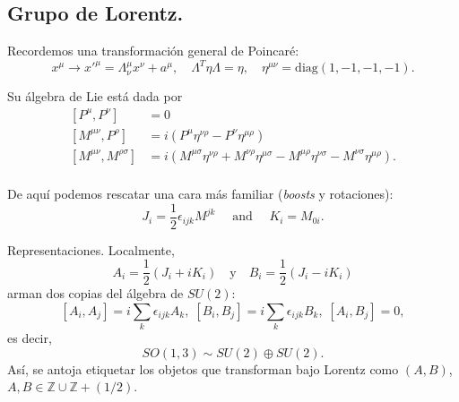 \documentclass[10pt,a4paper]{beamer}
\begin{document}
\subsection{Grupo de Lorentz.}
\begin{frame}{ \subsecname} 
  Recordemos una transformación general de Poincaré:
\[
  x^\mu \to x'^\mu = \Lambda^\mu_\nu x^\nu + a^\mu,\quad 
  \Lambda^T\eta\Lambda = \eta, \quad
\eta^{\mu\nu}=\text{diag}(1,-1,-1,-1).
\]

Su álgebra de Lie está dada por
\begin{equation}
  \label{equ:Lorentz_algebra}
  \begin{aligned}
  \left[P^\mu,P^\nu\right] &= 0\\
    \left[M^{\mu\nu},P^\rho\right] &= i\left(P^\mu\eta^{\nu\rho} -
  P^\nu\eta^{\mu\rho}\right)\\
  \left[M^{\mu\nu},M^{\rho\sigma}\right] &= i\left(M^{\mu\sigma}\eta^{\nu\rho} +M^{\nu\rho}\eta^{\mu\sigma} -
  M^{\mu\rho}\eta^{\nu\sigma} - M^{\nu\sigma}\eta^{\mu\rho} \right).\\
  \end{aligned}
  \end{equation}

  De aquí podemos rescatar una cara más familiar (\emph{boosts} y rotaciones):
\begin{equation}
  \label{equ:lorentz_gens}
  J_i = \frac{1}{2}\epsilon_{ijk}M^{jk} \quad \text{ and }\quad K_i = M_{0i}.
  \end{equation}

  
\end{frame}

\begin{frame}{Representaciones.}
  Localmente,
  \[
  A_i = \frac{1}{2}\left(J_i + iK_i\right) \quad \text{y} \quad  B_i = \frac{1}{2}\left(J_i
      - iK_i\right)
  \]
  arman dos copias del álgebra de  $SU(2)$:
      \[
        \left[A_i,A_j\right]= i\sum_k \epsilon_{ijk}A_k,\;
\left[B_i,B_j\right] =i\sum_k \epsilon_{ijk}B_k,\;
\left[A_i,B_j\right] = 0,
\]
es decir,
\[
  SO(1,3)\sim SU(2)\oplus SU(2).
\]
Así, se antoja etiquetar los objetos que transforman bajo Lorentz como $(A,B)$,  $A,B \in \mathbb{Z}
\cup \mathbb{Z} + (1/2)$. 

\end{frame}
\end{document}
